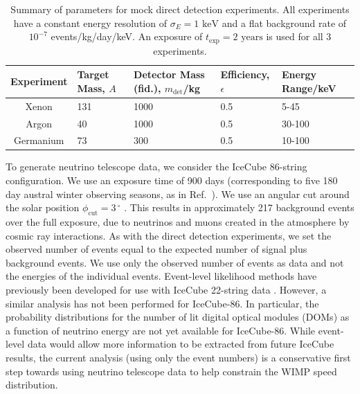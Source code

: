 \begin{table}[t]
  \setlength{\extrarowheight}{2pt}
  \begin{center}
	\begin{tabular}{c|m{1.2cm}m{2.2cm}m{2cm}m{2.1cm}}
        \hline\hline
	Experiment  & Target Mass, $A$ & Detector Mass (fid.), $m_\textrm{det}$/kg & Efficiency, $\epsilon$ & Energy Range/keV\\
	\hline
	Xenon  & 131  & 1000 & 0.5  & 5-45 \\
	Argon  & 40  & 1000 & 0.5  & 30-100  \\
        Germanium  & 73  & 300  & 0.5  & 10-100 \\
        \hline\hline
	\end{tabular}
  \end{center}
\caption[Parameter values for the mock direct detection experiments used in Chapter~\ref{ch:NT}]{Summary of parameters for mock direct detection experiments. All experiments have a constant energy resolution of $\sigma_E = 1 \textrm{ keV}$ and a flat background rate of $10^{-7}$ events/kg/day/keV. An exposure of $t_\textrm{exp} = 2 \textrm{ years}$ is used for all 3 experiments.}
\label{tab:NT:experiments}
\end{table}


To generate neutrino telescope data, we consider the IceCube 86-string configuration. We use an exposure time of 900 days (corresponding to five 180 day austral winter observing seasons, as in Ref.~\cite{Arina:2013}). We use an angular cut around the solar position $\phi_\textrm{cut} = 3\,^{\circ}$ \cite{Arina:2013}. This results in approximately 217 background events over the full exposure, due to neutrinos and muons created in the atmosphere by cosmic ray interactions. As with the direct detection experiments, we set the observed number of events equal to the expected number of signal plus background events. We use only the observed number of events as data and not the energies of the individual events. Event-level likelihood methods have previously been developed \cite{Scott:2012} for use with IceCube 22-string data \cite{Abbasi:2009}. However, a similar analysis has not been performed for IceCube-86. In particular, the probability distributions for the number of lit digital optical modules (DOMs) as a function of neutrino energy are not yet available for IceCube-86. While event-level data would allow more information to be extracted from future IceCube results, the current analysis (using only the event numbers) is a conservative first step towards using neutrino telescope data to help constrain the WIMP speed distribution.

